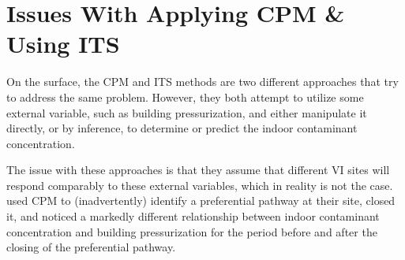 \begin{comment}
Main point is to point the issues with manipulating or utilizing an external variable.
I.e. sites give different responses to the same stimuli.
Again present a few examples of this (maybe just one?), but perhaps quite short as this will be covered in more detail in subsequent chapters.

Present thesis at the end of this section? (Probably)

Thesis:

Manipulation or use of external variables in VI will not yield the desired outcome, unless we improve our physical or mechanistic understanding of how these variables affect contaminant transport (or other phenomena).

Specifically, considering or determining the nature of the contaminant transport, whether advective or diffusive transport dominates, as it is key for understanding why different sites respond so differently to a change in pressurization.

For example, if contaminant transport is dominated diffusion, almost no relationship between entry rate and pressurization will exist, and as such pressurization might be a poor ITS, or CPM might not be as effective at such a site.

On the other hand, if advective transport dominates, pressurization can be a great ITS as advective transport is driven to a large degree by a pressure gradient.
\end{comment}

\section{Issues With Applying CPM \& Using ITS} %

On the surface, the CPM and ITS methods are two different approaches that try to address the same problem.
However, they both attempt to utilize some external variable, such as building pressurization, and either manipulate it directly, or by inference, to determine or predict the indoor contaminant concentration.

The issue with these approaches is that they assume that different VI sites will respond comparably to these external variables, which in reality is not the case.
\citeauthor{guo_identification_2015}\cite{guo_identification_2015} used CPM to (inadvertently) identify a preferential pathway at their site, closed it, and noticed a markedly different relationship between indoor contaminant concentration and building pressurization for the period before and after the closing of the preferential pathway.\par %

